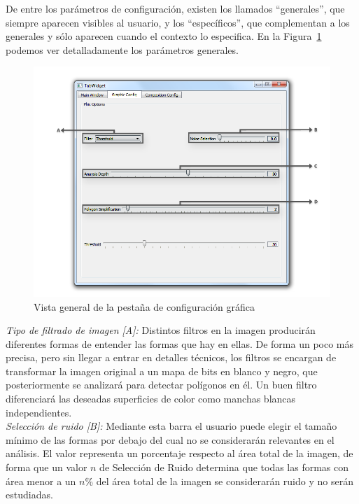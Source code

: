 		De entre los parámetros de configuración, existen los llamados ``generales'', que siempre aparecen visibles al usuario, y los ``específicos'', que complementan a los generales y sólo aparecen cuando el contexto lo especifica. En la Figura~\ref{fig:interfazgraphic} podemos ver detalladamente los parámetros generales.\\
		
		\begin{figure}[htbp]
		\centering
		\hspace*{-0.9in}
		\includegraphics[scale=0.57]{graphics/interfazgraphic.png}
		\caption{Vista general de la pestaña de configuración gráfica}
		\label{fig:interfazgraphic}
		\end{figure}
		
		\noindent\textit{Tipo de filtrado de imagen [A]:} Distintos filtros en la imagen producirán diferentes formas de entender las formas que hay en ellas. De forma un poco más precisa, pero sin llegar a entrar en detalles técnicos, los filtros se encargan de transformar la imagen original a un mapa de bits en blanco y negro, que posteriormente se analizará para detectar polígonos en él. Un buen filtro diferenciará las deseadas superficies de color como manchas blancas independientes.\\
		
		\noindent\textit{Selección de ruido [B]:} Mediante esta barra el usuario puede elegir el tamaño mínimo de las formas por debajo del cual no se considerarán relevantes en el análisis. El valor representa un porcentaje respecto al área total de la imagen, de forma que un valor $n$ de Selección de Ruido determina que todas las formas con área menor a un $n$\% del área total de la imagen se considerarán ruido y no serán estudiadas.\\
		
